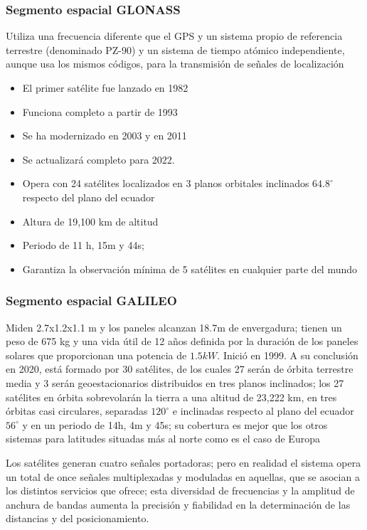 \subsubsection{Segmento espacial GLONASS}

Utiliza una frecuencia diferente que el GPS y un sistema propio de referencia terrestre (denominado PZ-90) y un sistema de tiempo atómico independiente, aunque usa los mismos códigos, para la transmisión de señales de localización

\begin{itemize}
    \item El primer satélite fue lanzado en 1982
    \item Funciona completo a partir de 1993
    \item Se ha modernizado en 2003 y en 2011
    \item Se actualizará completo para 2022.
    \item Opera con 24 satélites localizados en 3 planos orbitales inclinados $64.8^{\circ}$ respecto del plano del ecuador
    \item Altura de 19,100 km de altitud
    \item Periodo de 11 h, 15m y 44s;
    \item Garantiza la observación mínima de 5 satélites en cualquier parte del mundo
\end{itemize}

\subsubsection{Segmento espacial GALILEO}

Miden 2.7x1.2x1.1 m y los paneles alcanzan 18.7m de envergadura; tienen un peso de 675 kg y una vida útil de 12 años definida por la duración de los paneles solares que proporcionan una potencia de $1.5 kW$.
Inició en 1999. A su conclusión en 2020, está formado por 30 satélites, de los cuales 27 serán de órbita terrestre media y 3 serán geoestacionarios distribuidos en tres planos inclinados; los 27 satélites en órbita sobrevolarán la tierra a una altitud de 23,222 km, en tres órbitas casi circulares, separadas $120^{\circ}$ e inclinadas respecto al plano del ecuador $56^{\circ}$ y en un periodo de 14h, 4m y 45s; su cobertura es mejor que los otros sistemas para latitudes situadas más al norte como es el caso de Europa



Los satélites generan cuatro señales portadoras; pero en realidad el sistema opera un total de once señales multiplexadas y moduladas en aquellas, que se asocian a los distintos servicios que ofrece; esta diversidad de frecuencias y la amplitud de anchura de bandas aumenta la precisión y fiabilidad en la determinación de las distancias y del posicionamiento.

